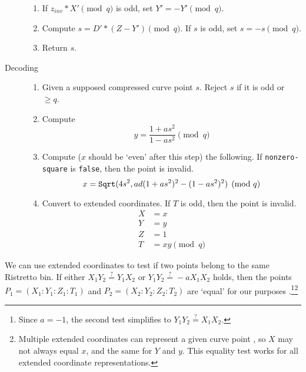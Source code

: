 \begin{description}
\begin{enumerate}
            \item If $z_{inv} * X' \pmod q$ is odd, set $Y' = -Y' \pmod q$.

            \item Compute $s = D' * (Z - Y') \pmod q$. If $s$ is odd, set $s = -s \pmod q$.
            \item Return $s$.
        \end{enumerate}

    \item[Decoding] \hfill
        \begin{enumerate}
            \item Given a supposed compressed curve point $s$. Reject $s$ if it is odd or $\geq q$.

            \item Compute
            \[y = \frac{1 + a s^2}{1 - a s^2} \pmod q\]

            \item Compute ($x$ should be `even' after this step) the following. If {\tt nonzero-square} is {\tt false}, then the point is invalid.\vspace{.155cm}
            \[x = \textrm{{\tt Sqrt}}(4 s^2, a d (1 + a s^2)^2 - (1 - a s^2)^2) \pmod q\]

            \item Convert to extended coordinates. If $T$ is odd, then the point is invalid.\vspace{.115cm}
            \begin{align*}
                X &= x \\
                Y &= y \\
                Z &= 1 \\
                T &= x y \pmod q
            \end{align*}
	    \end{enumerate}
\end{description}

We can use extended coordinates to test if two points belong to the same Ristretto bin. If either $X_1 Y_2 \stackrel{?}{=} Y_1 X_2$ or $Y_1 Y_2 \stackrel{?}{=} -a X_1 X_2$ holds, then the points $P_1 = (X_1 : Y_1 : Z_1 : T_1)$ and $P_2 = (X_2 : Y_2 : Z_2 : T_2)$ are `equal' for our purposes \cite{ristretto-equality}.\footnote{Since $a = -1$, the second test simplifies to $Y_1 Y_2 \stackrel{?}{=} X_1 X_2$.}\footnote{Multiple extended coordinates can represent a given curve point \cite{ristretto-what-is}, so $X$ may not always equal $x$, and the same for $Y$ and $y$. This equality test works for all extended coordinate representations.}\\

